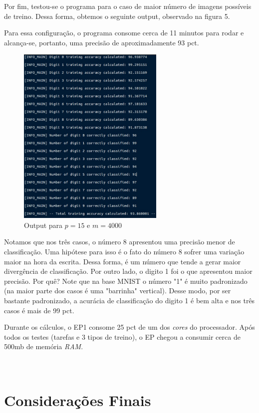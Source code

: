 \documentclass[twocolumn,amsmath,amssymb,floatfix]{revtex4}
\begin{document}
Por fim, testou-se o programa para o caso de maior número de imagens possíveis de treino. Dessa forma, obtemos o seguinte output, observado na figura 5.

Para essa configuração, o programa consome cerca de 11 minutos para rodar e alcança-se, portanto, uma precisão de aproximadamente 93 pct.

\begin{figure}[h!]
  \centering
  \includegraphics[width=7cm]{OUTPUT3.jpeg}
  \caption{Output para $p=15$ e $m=4000$}
\end{figure}

Notamos que nos três casos, o número 8 apresentou uma precisão menor de classificação. Uma hipótese para isso é o fato do número 8 sofrer uma variação maior na hora da escrita. Dessa forma, é um número que tende a gerar maior divergência de classificação. Por outro lado, o digito 1 foi o que apresentou maior precisão. Por quê? Note que na base MNIST o número "1" é muito padronizado (na maior parte dos casos é uma "barrinha" vertical). Desse modo, por ser bastante padronizado, a acurácia de classificação do digito 1 é bem alta e nos três casos é mais de 99 pct.

Durante os cálculos, o EP1 consome 25 pct de um dos \textit{cores} do processador. Após todos os testes (tarefas e 3 tipos de treino), o EP chegou a consumir cerca de 500mb de memória \textit{RAM}.\\\\\\

\section{Considerações Finais}
\end{document}
